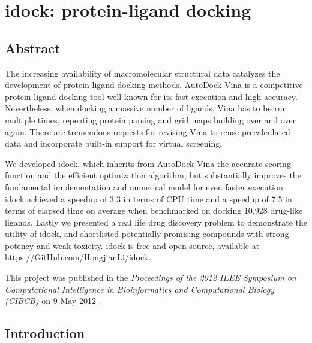 \chapter{idock: protein-ligand docking}

\section{Abstract}

The increasing availability of macromolecular structural data catalyzes the development of protein-ligand docking methods. AutoDock Vina is a competitive protein-ligand docking tool well known for its fast execution and high accuracy. Nevertheless, when docking a massive number of ligands, Vina has to be run multiple times, repeating protein parsing and grid maps building over and over again. There are tremendous requests for revising Vina to reuse precalculated data and incorporate built-in support for virtual screening.

We developed idock, which inherits from AutoDock Vina the accurate scoring function and the efficient optimization algorithm, but substantially improves the fundamental implementation and numerical model for even faster execution. idock achieved a speedup of 3.3 in terms of CPU time and a speedup of 7.5 in terms of elapsed time on average when benchmarked on docking 10,928 drug-like ligands. Lastly we presented a real life drug discovery problem to demonstrate the utility of idock, and shortlisted potentially promising compounds with strong potency and weak toxicity. idock is free and open source, available at https://GitHub.com/HongjianLi/idock.

This project was published in the \textit{Proceedings of the 2012 IEEE Symposium on Computational Intelligence in Bioinformatics and Computational Biology (CIBCB)} on 9 May 2012 \citep{1153}.

\section{Introduction}


